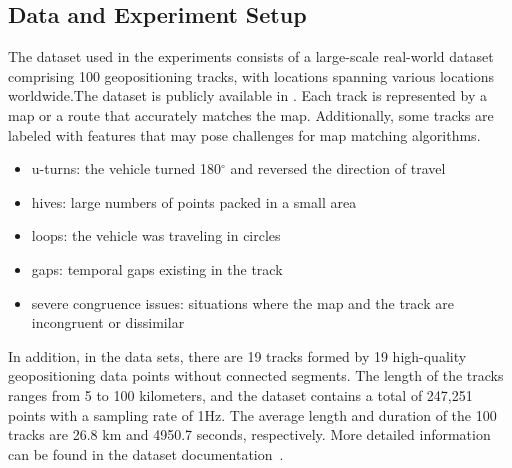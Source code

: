 \documentclass[preprint,12pt]{elsarticle}
\begin{document}
\subsection{Data and Experiment Setup}
\label{sec:sec4:sec1}
The dataset used in the experiments consists of a large-scale real-world dataset comprising 100 geopositioning tracks, with locations spanning various locations worldwide.The dataset is publicly available in \cite{dataset}. Each track is represented by a map or a route that accurately matches the map.
Additionally, some tracks are labeled with features that may pose challenges for map matching algorithms.
\begin{itemize}
	\item u-turns: the vehicle turned 180$^{\circ}$ and reversed the direction of travel
	\item hives: large numbers of points packed in a small area
	\item loops: the vehicle was traveling in circles
	\item gaps: temporal gaps existing in the track
	\item severe congruence issues: situations where the map and the track are incongruent or dissimilar
\end{itemize}
In addition, in the data sets, there are 19 tracks formed by 19 high-quality geopositioning data points without connected segments. The length of the tracks ranges from 5 to 100 kilometers, and the dataset contains a total of 247,251 points with a sampling rate of 1Hz.
The average length and duration of the 100 tracks are 26.8 km and 4950.7 seconds, respectively. 
More detailed information can be found in the dataset documentation~\cite{dataset}.
\end{document}
